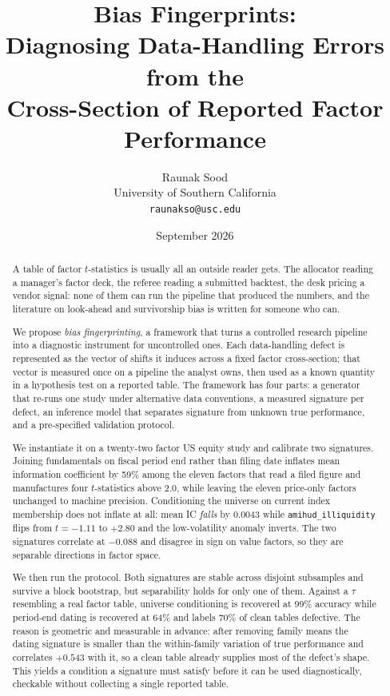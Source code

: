 \documentclass[11pt]{article}
\title{\bfseries Bias Fingerprints:\\[2pt]
Diagnosing Data-Handling Errors from the\\Cross-Section of Reported Factor Performance}
\author{Raunak Sood\\
\normalsize University of Southern California\\
\normalsize \texttt{raunakso@usc.edu}}
\date{September 2026}
\newcommand{\fac}[1]{\texttt{\small #1}}
\begin{document}
\maketitle

\begin{abstract}
\noindent
A table of factor $t$-statistics is usually all an outside reader gets. The allocator
reading a manager's factor deck, the referee reading a submitted backtest, the desk
pricing a vendor signal: none of them can run the pipeline that produced the numbers,
and the literature on look-ahead and survivorship bias is written for someone who can.

We propose \emph{bias fingerprinting}, a framework that turns a controlled research
pipeline into a diagnostic instrument for uncontrolled ones. Each data-handling defect is
represented as the vector of shifts it induces across a fixed factor cross-section; that
vector is measured once on a pipeline the analyst owns, then used as a known quantity in
a hypothesis test on a reported table. The framework has four parts: a generator that
re-runs one study under alternative data conventions, a measured signature per defect, an
inference model that separates signature from unknown true performance, and a
pre-specified validation protocol.

We instantiate it on a twenty-two factor US equity study and calibrate two signatures.
Joining fundamentals on fiscal period end rather than filing date inflates mean
information coefficient by 59\% among the eleven factors that read a filed figure and
manufactures four $t$-statistics above $2.0$, while leaving the eleven price-only factors
unchanged to machine precision. Conditioning the universe on current index membership
does not inflate at all: mean IC \emph{falls} by $0.0043$ while \fac{amihud\_illiquidity}
flips from $t = -1.11$ to $+2.80$ and the low-volatility anomaly inverts. The two
signatures correlate at $-0.088$ and disagree in sign on value factors, so they are
separable directions in factor space.

We then run the protocol. Both signatures are stable across disjoint subsamples and
survive a block bootstrap, but separability holds for only one of them. Against a
$\tau$ resembling a real factor table, universe conditioning is recovered at 99\%
accuracy while period-end dating is recovered at 64\% and labels 70\% of clean
tables defective. The reason is geometric and measurable in advance: after removing
family means the dating signature is smaller than the within-family variation of
true performance and correlates $+0.543$ with it, so a clean table already supplies
most of the defect's shape. This yields a condition a signature must satisfy before
it can be used diagnostically, checkable without collecting a single reported table.
\end{abstract}
\end{document}
